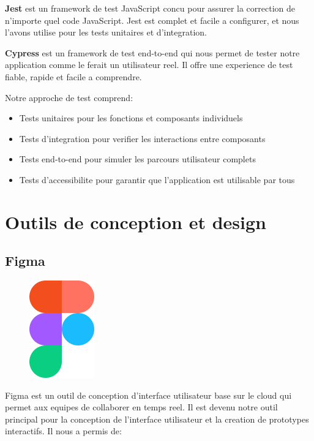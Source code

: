 \textbf{Jest} est un framework de test JavaScript concu pour assurer la correction de n'importe quel code JavaScript. Jest est complet et facile a configurer, et nous l'avons utilise pour les tests unitaires et d'integration.

\textbf{Cypress} est un framework de test end-to-end qui nous permet de tester notre application comme le ferait un utilisateur reel. Il offre une experience de test fiable, rapide et facile a comprendre.

Notre approche de test comprend:
\begin{itemize}
    \item Tests unitaires pour les fonctions et composants individuels
    \item Tests d'integration pour verifier les interactions entre composants
    \item Tests end-to-end pour simuler les parcours utilisateur complets
    \item Tests d'accessibilite pour garantir que l'application est utilisable par tous
\end{itemize}

\section{Outils de conception et design}

\subsection{Figma}
\begin{figure}
    \centering
    \includegraphics[width=0.25\textwidth]{assets/docs/figma.png}
\end{figure}
Figma est un outil de conception d'interface utilisateur base sur le cloud qui permet aux equipes de collaborer en temps reel. Il est devenu notre outil principal pour la conception de l'interface utilisateur et la creation de prototypes interactifs. Il nous a permis de:

